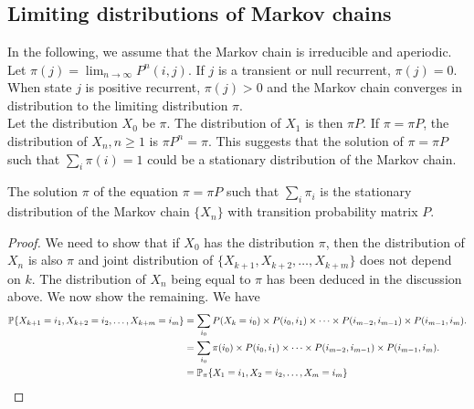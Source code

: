 \documentclass[all-lectures.tex]{subfiles}
\begin{document}

\setcounter{section}{2}
\setcounter{subsection}{0}

\section*{}
\subsection{Limiting distributions of Markov chains}
In the following, we assume that the Markov chain is irreducible and aperiodic. \\
\indent Let $\pi(j) = \lim_{n\rightarrow \infty} P^n(i,j)$. If $j$ is a transient or null recurrent, $\pi(j) = 0$. When state $j$ is positive recurrent, $\pi(j) > 0$ and the Markov chain converges in distribution to the limiting distribution $\pi$. \\
\indent Let the distribution $X_0$ be $\pi$. The distribution of $X_1$ is then $\pi P$. If $\pi = \pi P$, the distribution of $X_n, n \geq 1$ is $\pi P^n = \pi$. This suggests that the solution of $\pi = \pi P$ such that $\sum_i \pi(i) = 1$ could be a stationary distribution of the Markov chain.
\begin{prop}
The solution $\pi$ of the equation $\pi = \pi P$ such that $\sum_i \pi_i$ is the stationary distribution of the Markov chain $\{X_n\}$ with transition probability matrix $P$.
\begin{proof}
We need to show that if $X_0$ has the distribution $\pi$, then the distribution of $X_n$ is also $\pi$ and joint distribution of $\{X_{k+1},X_{k+2},\dots,X_{k+m}\}$ does not depend on $k$. The distribution of $X_n$ being equal to $\pi$ has been deduced in the discussion above. We now show the remaining. {\color{red}We have 
\begin{align*}
\P\{X_{k+1} = i_1,X_{k+2} = i_2,\dots,X_{k+m} = i_m\} &= \sum_{i_0} P(X_{k} = i_0) \times P(i_{0},i_{1}) \times \dots \times P(i_{m-2},i_{m-1}) \times P(i_{m-1},i_{m}) . \\
&= \sum_{i_0} \pi(i_0) \times P(i_{0},i_{1}) \times \dots  \times P(i_{m-2},i_{m-1}) \times P(i_{m-1},i_{m}). \\
&= \P_{\pi}\{X_{1} = i_1,X_{2} = i_2,\dots,X_{m} = i_m\} 
\end{align*}
}
\end{proof}
\end{prop}
\end{document}
